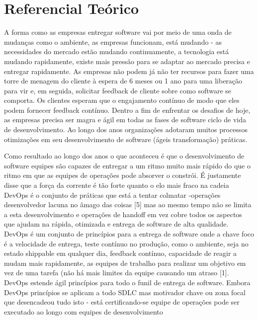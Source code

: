 \chapter{Referencial Teórico}
\label{cap-referencial}



A forma como as empresas entregar software vai
por meio de uma onda de mudanças como o ambiente,
as empresas funcionam, está mudando - as necessidades do mercado
estão mudando continuamente, a tecnologia está mudando
rapidamente, existe mais pressão para se adaptar ao mercado
precisa e entregar rapidamente. As empresas não podem
já não ter recursos para fazer uma torre de menagem do cliente à espera de
6 meses ou 1 ano para uma liberação para vir e, em seguida,
solicitar feedback de cliente sobre como software
se comporta. Os clientes esperam que o engajamento contínuo
de modo que eles podem fornecer feedback contínuo. Dentro
a fim de enfrentar os desafios de hoje, as empresas
precisa ser magra e ágil em todas as fases de
software ciclo de vida de desenvolvimento. Ao longo dos anos
organizações adotaram muitos processos
otimizações em seu desenvolvimento de software (ágeis
transformação) práticas. \cite{7173368}


Como resultado ao longo dos anos
o que aconteceu é que o desenvolvimento de software
equipes são capazes de entregar a um ritmo muito mais rápido do que
o ritmo em que as equipes de operações pode absorver o
constrói. É justamente disse que a força da corrente é
tão forte quanto o elo mais fraco na cadeia
DevOps é o conjunto de práticas que está a tentar colmatar
-operações desenvolvedor lacuna no âmago das coisas [5]
mas ao mesmo tempo não se limita a esta
desenvolvimento e operações de handoff em vez cobre
todos os aspectos que ajudam na rápida, otimizada e
entrega de software de alta qualidade. DevOps é um conjunto de
princípios para a entrega de software onde a chave
foco é a velocidade de entrega, teste contínuo no
produção, como o ambiente, seja no estado shippable
em qualquer dia, feedback contínuo, capacidade de reagir a
mudam mais rapidamente, as equipes de trabalho para realizar
um objetivo em vez de uma tarefa (não há mais limites da equipe
causando um atraso [1]. DevOps estende ágil
princípios para todo o funil de entrega de software.
Embora DevOps princípios se aplicam a todo SDLC
mas motivador chave ou zona focal que desencadeou tudo
isto - está certificando-se equipe de operações pode ser executado ao longo
com equipes de desenvolvimento \cite{7173368}



